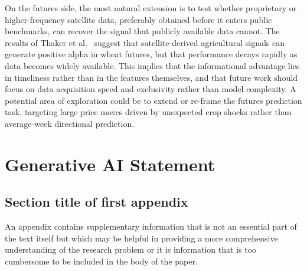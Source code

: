 \documentclass[pdflatex,sn-mathphys-num, oneside]{sn-jnl}%
\theoremstyle{thmstyleone}%
\theoremstyle{thmstyletwo}%
\theoremstyle{thmstylethree}%
\begin{document}
On the futures side, the most natural extension is to test whether proprietary or higher-frequency satellite data, preferably obtained before it enters public benchmarks, can recover the signal that publicly available data cannot. The results of Thaker et al.~\cite{bib19} suggest that satellite-derived agricultural signals can generate positive alpha in wheat futures, but that performance decays rapidly as data becomes widely available. This implies that the informational advantage lies in timeliness rather than in the features themselves, and that future work should focus on data acquisition speed and exclusivity rather than model complexity. A potential area of exploration could be to extend or re-frame the futures prediction task, targeting large price moves driven by unexpected crop shocks rather than average-week directional prediction.


\clearpage


\clearpage

\section{Generative AI Statement}

\clearpage

\begin{appendices}

\section{Section title of first appendix}\label{secA1}

An appendix contains supplementary information that is not an essential part of the text itself but which may be helpful in providing a more comprehensive understanding of the research problem or it is information that is too cumbersome to be included in the body of the paper.




\end{appendices}
\end{document}
